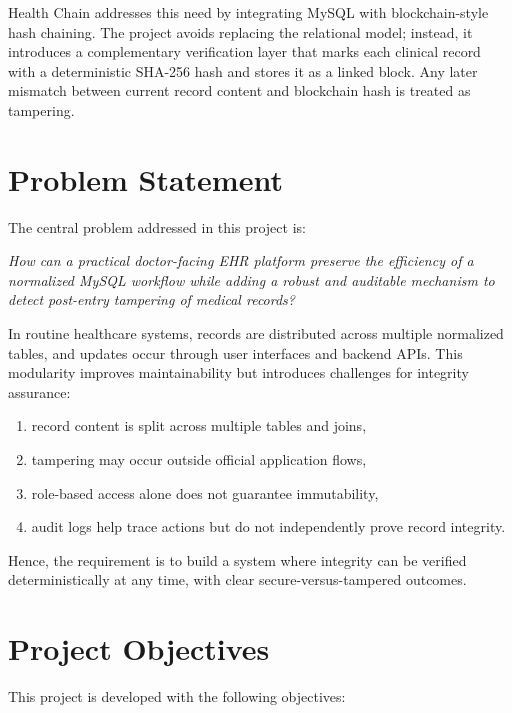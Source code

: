 \documentclass[12pt,a4paper]{report}
\begin{document}
Health Chain addresses this need by integrating MySQL with blockchain-style hash chaining. The project avoids replacing the relational model; instead, it introduces a complementary verification layer that marks each clinical record with a deterministic SHA-256 hash and stores it as a linked block. Any later mismatch between current record content and blockchain hash is treated as tampering.

\section{Problem Statement}

The central problem addressed in this project is:

\textit{How can a practical doctor-facing EHR platform preserve the efficiency of a normalized MySQL workflow while adding a robust and auditable mechanism to detect post-entry tampering of medical records?}

In routine healthcare systems, records are distributed across multiple normalized tables, and updates occur through user interfaces and backend APIs. This modularity improves maintainability but introduces challenges for integrity assurance:

\begin{enumerate}
\item record content is split across multiple tables and joins,
\item tampering may occur outside official application flows,
\item role-based access alone does not guarantee immutability,
\item audit logs help trace actions but do not independently prove record integrity.
\end{enumerate}

Hence, the requirement is to build a system where integrity can be verified deterministically at any time, with clear secure-versus-tampered outcomes.

\section{Project Objectives}

This project is developed with the following objectives:
\end{document}
